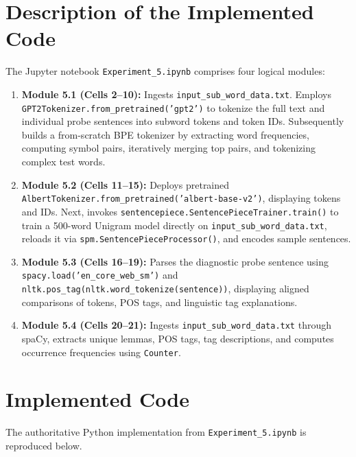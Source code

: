 \documentclass[12pt,a4paper]{report}
\begin{document}
\section{Description of the Implemented Code}
The Jupyter notebook \texttt{Experiment\_5.ipynb} comprises four logical modules:
\begin{enumerate}
    \item \textbf{Module 5.1 (Cells 2--10):} Ingests \texttt{input\_sub\_word\_data.txt}. Employs \texttt{GPT2Tokenizer.from\_pretrained('gpt2')} to tokenize the full text and individual probe sentences into subword tokens and token IDs. Subsequently builds a from-scratch BPE tokenizer by extracting word frequencies, computing symbol pairs, iteratively merging top pairs, and tokenizing complex test words.
    \item \textbf{Module 5.2 (Cells 11--15):} Deploys pretrained \texttt{AlbertTokenizer.from\_pretrained('albert-base-v2')}, displaying tokens and IDs. Next, invokes \texttt{sentencepiece.SentencePieceTrainer.train()} to train a 500-word Unigram model directly on \texttt{input\_sub\_word\_data.txt}, reloads it via \texttt{spm.SentencePieceProcessor()}, and encodes sample sentences.
    \item \textbf{Module 5.3 (Cells 16--19):} Parses the diagnostic probe sentence using \texttt{spacy.load('en\_core\_web\_sm')} and \texttt{nltk.pos\_tag(nltk.word\_tokenize(sentence))}, displaying aligned comparisons of tokens, POS tags, and linguistic tag explanations.
    \item \textbf{Module 5.4 (Cells 20--21):} Ingests \texttt{input\_sub\_word\_data.txt} through spaCy, extracts unique lemmas, POS tags, tag descriptions, and computes occurrence frequencies using \texttt{Counter}.
\end{enumerate}

\section{Implemented Code}
The authoritative Python implementation from \texttt{Experiment\_5.ipynb} is reproduced below.
\end{document}
